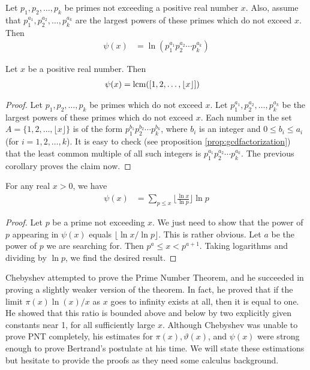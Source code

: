 	\begin{corollary}
		Let $p_1, p_2, \ldots, p_k$ be primes not exceeding a positive real number $x$. Also, assume that $p_1^{a_1}, p_2^{a_2}, \ldots, p_k^{a_k}$ are the largest powers of these primes which do not exceed $x$. Then
			\begin{align*}
				\psi(x)
					& =\ln \left( p_1^{a_1} p_2^{a_2} \cdots p_k^{a_k} \right)
			\end{align*}
	\end{corollary}

	\begin{corollary}
		Let $x$ be a positive real number. Then
			\begin{align*}
				\psi(x)
					& = \operatorname{lcm}([1, 2, \ldots, \lfloor x \rfloor])
			\end{align*}
	\end{corollary}

	\begin{proof}
		Let $p_1, p_2, \ldots, p_k$ be primes which do not exceed $x$. Let $p_1^{a_1}, p_2^{a_2}, \ldots , p_k^{a_k}$ be the largest powers of these primes which do not exceed $x$. Each number in the set $A=\{1, 2, \ldots, \lfloor x \rfloor\}$ is of the form $p_1^{b_1} p_2^{b_2} \cdots p_k^{b_k}$, where $b_i$ is an integer and $0 \leq b_i \leq a_i$ (for $i=1,2,\ldots,k$). It is easy to check (see proposition \eqref{prop:gcdfactorization}) that the least common multiple of all such integers is $p_1^{a_1} p_2^{a_2} \cdots p_k^{a_k}$. The previous corollary proves the claim now.
	\end{proof}

	\begin{proposition}
		\label{prop:chebyshevpsiinequality}
		For any real $x>0$, we have
			\begin{align*}
				\psi(x) & = \sum_{p \leq x} \Big\lfloor\frac{\ln x}{\ln p} \Big\rfloor \ln p
			\end{align*}
	\end{proposition}

	\begin{proof}
		Let $p$ be a prime not exceeding $x$. We just need to show that the power of $p$ appearing in $\psi(x)$ equals $\lfloor \ln x/\ln p \rfloor$. This is rather obvious. Let $a$ be the power of $p$ we are searching for. Then $p^a \leq x <p^{a+1}$. Taking logarithms and dividing by $\ln p$, we find the desired result.
	\end{proof}

Chebyshev attempted to prove the Prime Number Theorem, and he succeeded in proving a slightly weaker version of the theorem. In fact, he proved that if the limit $\pi(x)  \ln(x)/x$ as $x$ goes to infinity exists at all, then it is equal to one. He showed that this ratio is bounded above and below by two explicitly given constants near 1, for all sufficiently large $x$. Although Chebyshev was unable to prove PNT completely, his estimates for $\pi(x), \vartheta(x)$, and $\psi(x)$ were strong enough to prove Bertrand's postulate at his time. We will state these estimations but hesitate to provide the proofs as they need some calculus background.

